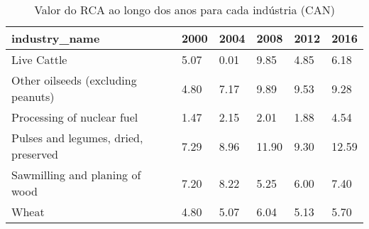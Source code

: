 \begin{table}
\centering
\caption{Valor do RCA ao longo dos anos para cada indústria (CAN)}
\begin{tabular}{p{6cm}p{1.5cm}p{1.5cm}p{1.5cm}p{1.5cm}p{1.5cm}}
\toprule
                       industry\_name & 2000 & 2004 &  2008 & 2012 &  2016 \\
\midrule
                         Live Cattle & 5.07 & 0.01 &  9.85 & 4.85 &  6.18 \\
  Other oilseeds (excluding peanuts) & 4.80 & 7.17 &  9.89 & 9.53 &  9.28 \\
          Processing of nuclear fuel & 1.47 & 2.15 &  2.01 & 1.88 &  4.54 \\
Pulses and legumes, dried, preserved & 7.29 & 8.96 & 11.90 & 9.30 & 12.59 \\
      Sawmilling and planing of wood & 7.20 & 8.22 &  5.25 & 6.00 &  7.40 \\
                               Wheat & 4.80 & 5.07 &  6.04 & 5.13 &  5.70 \\
\bottomrule
\end{tabular}
\end{table}
